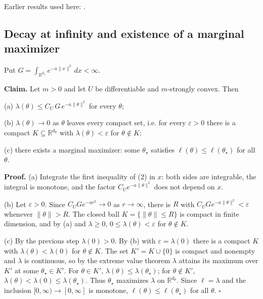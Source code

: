 \documentclass[11pt,a4paper]{report}
\begin{document}
Earlier results used here: \cite[Section~3.26.4]{LangevinLean2026ULASC}.
\subsection{\texorpdfstring{Decay at infinity and existence of a marginal maximizer}{Decay at infinity and existence of a marginal maximizer}}
\label{report-step-IPLA-MarginalConcentration-lean-4}


Put \(G=\int_{\mathbb R^{d_x}}e^{-a\|x\|^2}\,dx<\infty\).




\textbf{Claim.} Let \(m>0\) and let \(U\) be differentiable and \(m\)-strongly convex. Then




(a) \(\lambda(\theta)\le C_U\,G\,e^{-a\|\theta\|^2}\) for every \(\theta\);




(b) \(\lambda(\theta)\to0\) as \(\theta\) leaves every compact set, i.e. for every \(\varepsilon>0\) there is a compact \(K\subseteq\mathbb R^{d_\theta}\) with \(\lambda(\theta)<\varepsilon\) for \(\theta\notin K\);




(c) there exists a marginal maximizer: some \(\theta_\star\) satisfies \(\ell(\theta)\le\ell(\theta_\star)\) for all \(\theta\).




\textbf{Proof.} (a) Integrate the first inequality of (2) in \(x\): both sides are integrable, the integral is monotone, and the factor \(C_Ue^{-a\|\theta\|^2}\) does not depend on \(x\).




(b) Let \(\varepsilon>0\). Since \(C_UGe^{-ar^2}\to0\) as \(r\to\infty\), there is \(R\) with \(C_UGe^{-a\|\theta\|^2}<\varepsilon\) whenever \(\|\theta\|>R\). The closed ball \(K=\{\|\theta\|\le R\}\) is compact in finite dimension, and by (a) and \(\lambda\ge0\), \(0\le\lambda(\theta)<\varepsilon\) for \(\theta\notin K\).




(c) By the previous step \(\lambda(0)>0\). By (b) with \(\varepsilon=\lambda(0)\) there is a compact \(K\) with \(\lambda(\theta)<\lambda(0)\) for \(\theta\notin K\). The set \(K'=K\cup\{0\}\) is compact and nonempty and \(\lambda\) is continuous, so by the extreme value theorem \(\lambda\) attains its maximum over \(K'\) at some \(\theta_\star\in K'\). For \(\theta\in K'\), \(\lambda(\theta)\le\lambda(\theta_\star)\); for \(\theta\notin K'\), \(\lambda(\theta)<\lambda(0)\le\lambda(\theta_\star)\). Thus \(\theta_\star\) maximizes \(\lambda\) on \(\mathbb R^{d_\theta}\). Since \(\ell=\lambda\) and the inclusion \([0,\infty)\to[0,\infty]\) is monotone, \(\ell(\theta)\le\ell(\theta_\star)\) for all \(\theta\). \(\square\)
\end{document}
